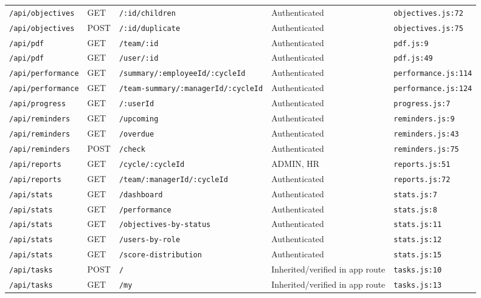 \begin{landscape}
\begin{longtable}{p{}p{}p{}p{}p{}}
\texttt{/api/objectives} & GET & \texttt{/:id/children} & Authenticated & \texttt{objectives.js:72}\\
\texttt{/api/objectives} & POST & \texttt{/:id/duplicate} & Authenticated & \texttt{objectives.js:75}\\
\texttt{/api/pdf} & GET & \texttt{/team/:id} & Authenticated & \texttt{pdf.js:9}\\
\texttt{/api/pdf} & GET & \texttt{/user/:id} & Authenticated & \texttt{pdf.js:49}\\
\texttt{/api/performance} & GET & \texttt{/summary/:employeeId/:cycleId} & Authenticated & \texttt{performance.js:114}\\
\texttt{/api/performance} & GET & \texttt{/team-summary/:managerId/:cycleId} & Authenticated & \texttt{performance.js:124}\\
\texttt{/api/progress} & GET & \texttt{/:userId} & Authenticated & \texttt{progress.js:7}\\
\texttt{/api/reminders} & GET & \texttt{/upcoming} & Authenticated & \texttt{reminders.js:9}\\
\texttt{/api/reminders} & GET & \texttt{/overdue} & Authenticated & \texttt{reminders.js:43}\\
\texttt{/api/reminders} & POST & \texttt{/check} & Authenticated & \texttt{reminders.js:75}\\
\texttt{/api/reports} & GET & \texttt{/cycle/:cycleId} & ADMIN,  HR & \texttt{reports.js:51}\\
\texttt{/api/reports} & GET & \texttt{/team/:managerId/:cycleId} & Authenticated & \texttt{reports.js:72}\\
\texttt{/api/stats} & GET & \texttt{/dashboard} & Authenticated & \texttt{stats.js:7}\\
\texttt{/api/stats} & GET & \texttt{/performance} & Authenticated & \texttt{stats.js:8}\\
\texttt{/api/stats} & GET & \texttt{/objectives-by-status} & Authenticated & \texttt{stats.js:11}\\
\texttt{/api/stats} & GET & \texttt{/users-by-role} & Authenticated & \texttt{stats.js:12}\\
\texttt{/api/stats} & GET & \texttt{/score-distribution} & Authenticated & \texttt{stats.js:15}\\
\texttt{/api/tasks} & POST & \texttt{/} & Inherited/verified in app route & \texttt{tasks.js:10}\\
\texttt{/api/tasks} & GET & \texttt{/my} & Inherited/verified in app route & \texttt{tasks.js:13}\\

\end{longtable}
\end{landscape}
